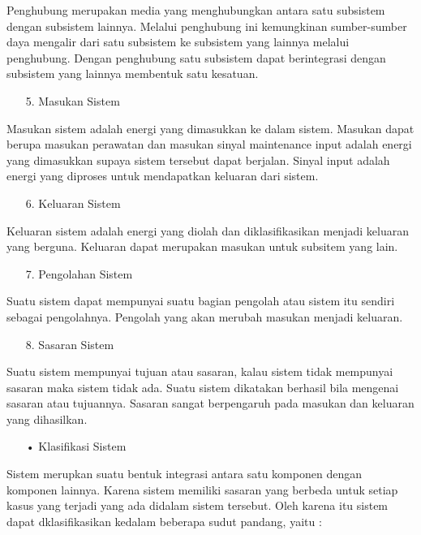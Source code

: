 \documentclass{jtetiproposalskripsi}
\begin{document}
Penghubung merupakan media yang menghubungkan antara satu subsistem dengan subsistem lainnya. Melalui penghubung ini kemungkinan sumber-sumber daya mengalir dari satu subsistem ke subsistem yang lainnya melalui penghubung. Dengan penghubung satu subsistem dapat berintegrasi dengan subsistem yang lainnya membentuk satu kesatuan.

\begin{itemize}
\item[5.] Masukan Sistem
\end{itemize}

Masukan sistem adalah energi yang dimasukkan ke dalam sistem. Masukan dapat berupa masukan perawatan dan masukan sinyal maintenance input adalah energi yang dimasukkan supaya sistem tersebut dapat berjalan. Sinyal input adalah energi yang diproses untuk mendapatkan keluaran dari sistem.
\begin{itemize}
\item[6.] Keluaran Sistem
\end{itemize}

Keluaran sistem adalah energi yang diolah dan diklasifikasikan menjadi keluaran yang berguna. Keluaran dapat merupakan masukan untuk subsitem yang lain.
\begin{itemize}
\item[7.] Pengolahan Sistem
\end{itemize}

Suatu sistem dapat mempunyai suatu bagian pengolah atau sistem itu sendiri sebagai pengolahnya. Pengolah yang akan merubah masukan menjadi keluaran.

\begin{itemize}
\item[8.] Sasaran Sistem
\end{itemize}

Suatu sistem mempunyai tujuan atau sasaran, kalau sistem tidak mempunyai sasaran maka sistem tidak ada. Suatu sistem dikatakan berhasil bila mengenai sasaran atau tujuannya. Sasaran sangat berpengaruh pada masukan dan keluaran yang dihasilkan.

\begin{itemize}
\item[•] Klasifikasi Sistem
\end{itemize}

Sistem merupkan suatu bentuk integrasi antara satu komponen dengan komponen lainnya. Karena sistem memiliki sasaran yang berbeda untuk setiap kasus yang terjadi yang ada didalam sistem tersebut. Oleh karena itu sistem dapat dklasifikasikan kedalam beberapa sudut pandang, yaitu :
\end{document}
